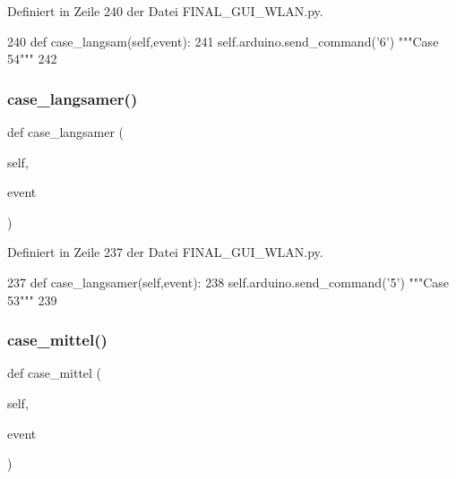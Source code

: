 Definiert in Zeile 240 der Datei F\+I\+N\+A\+L\+\_\+\+G\+U\+I\+\_\+\+W\+L\+A\+N.\+py.


\begin{DoxyCode}
240     \textcolor{keyword}{def }case\_langsam(self,event):
241         self.arduino.send\_command(\textcolor{stringliteral}{'6'})  \textcolor{stringliteral}{"""Case 54"""}
242         
\end{DoxyCode}
\mbox{\label{class_f_i_n_a_l___g_u_i___w_l_a_n_1_1_w_l_a_n_ac23ccd4dbef43aed4a57e85fc080f382}} 
\subsubsection{\texorpdfstring{case\+\_\+langsamer()}{case\_langsamer()}}
{\footnotesize\ttfamily def case\+\_\+langsamer (\begin{DoxyParamCaption}\item[{}]{self,  }\item[{}]{event }\end{DoxyParamCaption})}



Definiert in Zeile 237 der Datei F\+I\+N\+A\+L\+\_\+\+G\+U\+I\+\_\+\+W\+L\+A\+N.\+py.


\begin{DoxyCode}
237     \textcolor{keyword}{def }case\_langsamer(self,event):
238         self.arduino.send\_command(\textcolor{stringliteral}{'5'})  \textcolor{stringliteral}{"""Case 53"""}
239     
\end{DoxyCode}
\mbox{\label{class_f_i_n_a_l___g_u_i___w_l_a_n_1_1_w_l_a_n_aaa6564152488bb223e78dbf2fad01126}} 
\subsubsection{\texorpdfstring{case\+\_\+mittel()}{case\_mittel()}}
{\footnotesize\ttfamily def case\+\_\+mittel (\begin{DoxyParamCaption}\item[{}]{self,  }\item[{}]{event }\end{DoxyParamCaption})}



